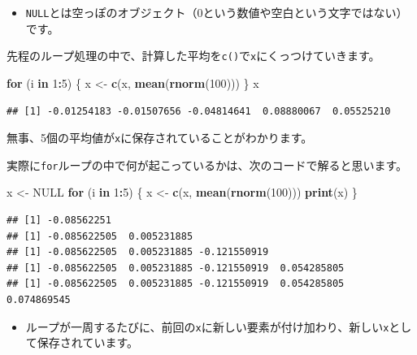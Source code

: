 \documentclass[]{bxjsreport}
\newenvironment{Shaded}{\begin{snugshade}}{\end{snugshade}}
\newcommand{\ControlFlowTok}[1]{\textcolor[rgb]{0.13,0.29,0.53}{\textbf{#1}}}
\newcommand{\DecValTok}[1]{\textcolor[rgb]{0.00,0.00,0.81}{#1}}
\newcommand{\KeywordTok}[1]{\textcolor[rgb]{0.13,0.29,0.53}{\textbf{#1}}}
\newcommand{\NormalTok}[1]{#1}
\newcommand{\OperatorTok}[1]{\textcolor[rgb]{0.81,0.36,0.00}{\textbf{#1}}}
\newcommand{\OtherTok}[1]{\textcolor[rgb]{0.56,0.35,0.01}{#1}}
\newcommand{\StringTok}[1]{\textcolor[rgb]{0.31,0.60,0.02}{#1}}
\providecommand{\tightlist}{%
  \setlength{\itemsep}{0pt}\setlength{\parskip}{0pt}}
\begin{document}
\begin{itemize}
\tightlist
\item
  \texttt{NULL}とは空っぽのオブジェクト（0という数値や空白という文字ではない）です。
\end{itemize}

先程のループ処理の中で、計算した平均を\texttt{c()}で\texttt{x}にくっつけていきます。

\begin{Shaded}
\begin{Highlighting}[]
\ControlFlowTok{for}\NormalTok{ (i }\ControlFlowTok{in} \DecValTok{1}\OperatorTok{:}\DecValTok{5}\NormalTok{) \{}
\NormalTok{  x <-}\StringTok{ }\KeywordTok{c}\NormalTok{(x, }\KeywordTok{mean}\NormalTok{(}\KeywordTok{rnorm}\NormalTok{(}\DecValTok{100}\NormalTok{)))}
\NormalTok{\}}
\NormalTok{x}
\end{Highlighting}
\end{Shaded}

\begin{verbatim}
## [1] -0.01254183 -0.01507656 -0.04814641  0.08880067  0.05525210
\end{verbatim}

無事、5個の平均値が\texttt{x}に保存されていることがわかります。

実際に\texttt{for}ループの中で何が起こっているかは、次のコードで解ると思います。

\begin{Shaded}
\begin{Highlighting}[]
\NormalTok{x <-}\StringTok{ }\OtherTok{NULL}
\ControlFlowTok{for}\NormalTok{ (i }\ControlFlowTok{in} \DecValTok{1}\OperatorTok{:}\DecValTok{5}\NormalTok{) \{}
\NormalTok{  x <-}\StringTok{ }\KeywordTok{c}\NormalTok{(x, }\KeywordTok{mean}\NormalTok{(}\KeywordTok{rnorm}\NormalTok{(}\DecValTok{100}\NormalTok{)))}
  \KeywordTok{print}\NormalTok{(x)}
\NormalTok{\}}
\end{Highlighting}
\end{Shaded}

\begin{verbatim}
## [1] -0.08562251
## [1] -0.085622505  0.005231885
## [1] -0.085622505  0.005231885 -0.121550919
## [1] -0.085622505  0.005231885 -0.121550919  0.054285805
## [1] -0.085622505  0.005231885 -0.121550919  0.054285805  0.074869545
\end{verbatim}

\begin{itemize}
\tightlist
\item
  ループが一周するたびに、前回の\texttt{x}に新しい要素が付け加わり、新しい\texttt{x}として保存されています。
\end{itemize}
\end{document}
